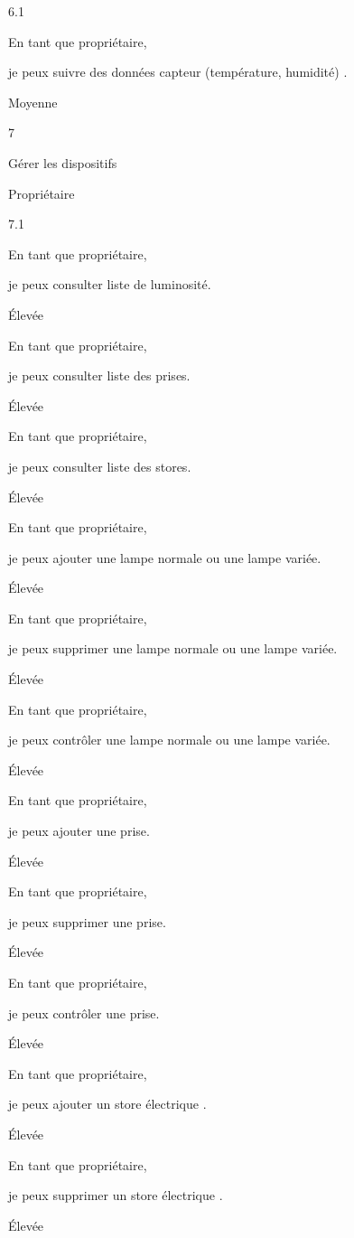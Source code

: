 \documentclass{article}
\begin{document}
6.1

En tant que propriétaire,

je peux suivre des données capteur (température, humidité) .

Moyenne

7

Gérer les dispositifs

Propriétaire

7.1

En tant que propriétaire,

je peux consulter  liste de  luminosité.

Élevée

En tant que propriétaire,

je peux consulter  liste des prises.

Élevée

En tant que propriétaire,

je peux consulter  liste des stores.

Élevée

En tant que propriétaire,

je peux ajouter  une lampe normale ou  une lampe variée.

Élevée

En tant que propriétaire,

je peux supprimer  une lampe normale ou  une lampe variée.

Élevée

En tant que propriétaire,

je peux contrôler   une lampe normale ou  une lampe variée.

Élevée

En tant que propriétaire,

je peux ajouter  une prise.

Élevée

En tant que propriétaire,

je peux supprimer  une prise.

Élevée

En tant que propriétaire,

je peux contrôler  une prise.

Élevée

En tant que propriétaire,

je peux ajouter  un store électrique .

Élevée

En tant que propriétaire,

je peux supprimer  un store électrique .

Élevée
\end{document}
